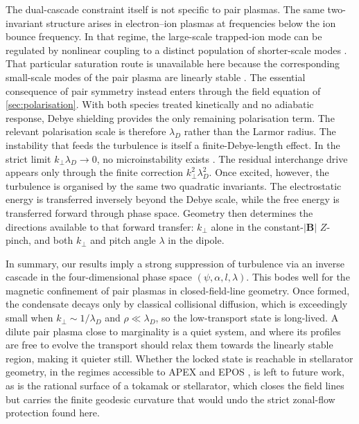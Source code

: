 \documentclass{jpp}
\newcommand{\bB}{\mathbf{B}}
\newcommand{\kperp}{k_\perp}
\newcommand{\lambdaD}{\lambda_D}
\begin{document}
The dual-cascade constraint itself is not specific to pair plasmas. The same two-invariant structure arises in electron--ion plasmas at frequencies below the ion bounce frequency. In that regime, the large-scale trapped-ion mode can be regulated by nonlinear coupling to a distinct population of shorter-scale modes \citep{Kingsbury1994}. That particular saturation route is unavailable here because the corresponding small-scale modes of the pair plasma are linearly stable \citep{Helander2014}. The essential consequence of pair symmetry instead enters through the field equation of \cref{sec:polarisation}. With both species treated kinetically and no adiabatic response, Debye shielding provides the only remaining polarisation term. The relevant polarisation scale is therefore $\lambdaD$ rather than the Larmor radius. The instability that feeds the turbulence is itself a finite-Debye-length effect. In the strict limit $\kperp\lambdaD\to0$, no microinstability exists \citep{Helander2014}. The residual interchange drive appears only through the finite correction $\kperp^2\lambdaD^2$. Once excited, however, the turbulence is organised by the same two quadratic invariants. The electrostatic energy is transferred inversely beyond the Debye scale, while the free energy is transferred forward through phase space. Geometry then determines the directions available to that forward transfer: $\kperp$ alone in the constant-$|\bB|$ $Z$-pinch, and both $\kperp$ and pitch angle $\lambda$ in the dipole.



In summary, our results imply a strong suppression of turbulence via an inverse cascade in the four-dimensional phase space $(\psi, \alpha, l, \lambda)$. This bodes well for the magnetic confinement of pair plasmas in closed-field-line geometry. Once formed, the condensate decays only by classical collisional diffusion, which is exceedingly small when $\kperp\sim 1/\lambdaD$ and $\rho\ll\lambdaD$, so the low-transport state is long-lived. A dilute pair plasma close to marginality is a quiet system, and where its profiles are free to evolve the transport should relax them towards the linearly stable region, making it quieter still. Whether the locked state is reachable in stellarator geometry, in the regimes accessible to APEX and EPOS \citep{Pedersen2012, Stoneking2020}, is left to future work, as is the rational surface of a tokamak or stellarator, which closes the field lines but carries the finite geodesic curvature that would undo the strict zonal-flow protection found here.
\end{document}
